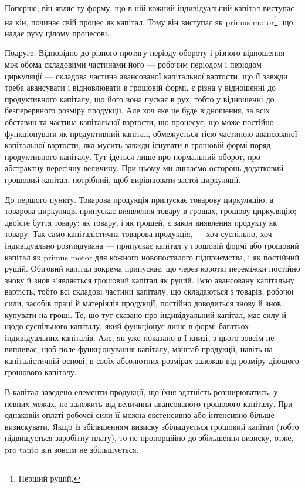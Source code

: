 
Поперше, він являє ту форму, що в ній кожний індивідуальний капітал
виступає на кін, починає свій процес як капітал. Тому він виступає
як primus motor\footnote*{
Перший рушій. 
}, що надає руху цілому процесові.

Подруге. Відповідно до різного протягу періоду обороту і різного
відношення між обома складовими частинами його — робочим періодом і
періодом циркуляції — складова частина авансованої капітальної вартости,
що її завжди треба авансувати і відновлювати в грошовій формі, є різна
у відношенні до продуктивного капіталу, що його вона пускає в рух,
тобто у відношенні до безперервного розміру продукції. Але хоч яке
це буде відношення, за всіх обставин та частина капітальної вартости,
що процесує, що може постійно функціонувати як продуктивний капітал,
обмежується тією частиною авансованої капітальної вартости, яка мусить
завжди існувати в грошовій формі поряд продуктивного капіталу. Тут
ідеться лише про нормальний оборот, про абстрактну пересічну величину.
При цьому ми лишаємо осторонь додатковий грошовий капітал,
потрібний, щоб вирівнювати застої циркуляції.

До першого пункту. Товарова продукція припускає товарову
циркуляцію, а товарова циркуляція припускає виявлення товару в грошах,
грошову циркуляцію; двоїсте буття товару: як товару, і як грошей,
є закон виявлення продукту як товару. Так само капіталістична товарова
продукція, — хоч суспільно, хоч індивідуально розглядувана —
припускає капітал у грошовій формі або грошовий капітал як primus
motor для кожного новопосталого підприємства, і як постійний рушій. Обіговий
капітал зокрема припускає, що через короткі переміжки постійно
знову й знов з’являється грошовий капітал як рушій. Всю авансовану
капітальну вартість, тобто всі складові частини капіталу, що складаються
з товарів, робочої сили, засобів праці й матеріялів продукції, постійно
доводиться знову й знов купувати на гроші. Те, що тут сказано про індивідуальний
капітал, має силу й щодо суспільного капіталу, який функціонує
лише в формі багатьох індивідуальних капіталів. Але, як уже показано
в І книзі, з цього зовсім не випливає, щоб поле функціонування
капіталу, маштаб продукції, навіть на капіталістичній основі, в своїх
абсолютних розмірах залежав від розміру діющого грошового капіталу.

В капітал заведено елементи продукції, що їхня здатність розширюватись,
у певних межах, не залежить від величини авансованого грошового
капіталу. При однаковій оплаті робочої сили її можна екстенсивно
або інтенсивно більше визискувати. Якщо із збільшенням визиску збільшується
грошовий капітал (тобто підвищується заробітну плату), то не
пропорційно до збільшення визиску, отже, pro tanto він зовсім не збільшується.

